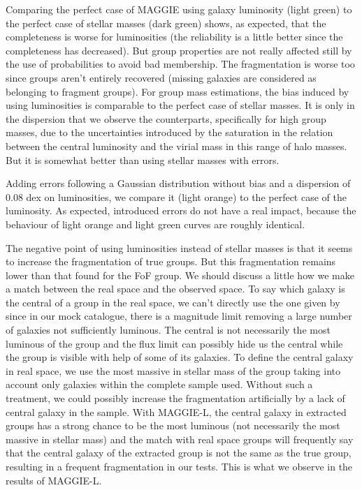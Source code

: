 Comparing the perfect case of MAGGIE using galaxy luminosity (light green) to
the perfect case of stellar masses (dark green) shows, as expected, that the
completeness is worse for luminosities (the reliability is a little better
since the completeness has decreased). But group properties are not really
affected still by the use of probabilities to avoid bad membership. The
fragmentation is worse too since groups aren't entirely recovered (missing
galaxies are considered as belonging to fragment groups). For group mass
estimations, the bias induced by using luminosities is comparable to the
perfect case of stellar masses. It is only in the dispersion that we observe
the counterparts, specifically for high group masses, due to the uncertainties
introduced by the saturation in the relation between the central luminosity and
the virial mass in this range of halo masses. But it is somewhat better
than using stellar masses with errors.

Adding errors following a Gaussian distribution without bias and a dispersion
of 0.08 dex on luminosities, we compare it (light orange) to the perfect case
of the luminosity. As expected, introduced errors do not have a real impact,
because the behaviour of light orange and light green curves are roughly
identical.

The negative point of using luminosities instead of stellar masses is that it
seems to increase the fragmentation of true groups. But this fragmentation
remains lower than that found for the FoF group. We should discuss a little how
we make a match between the real space and the observed space. To say which
galaxy is the central of a group in the real space, we can't directly use the
one given by~\cite{Guo+11} since in our mock catalogue, there is a magnitude
limit removing a large number of galaxies not sufficiently luminous. The
central is not necessarily the most luminous of the group and the flux limit
can possibly hide us the central while the group is visible with help of some
of its galaxies. To define the central galaxy in real space, we use the most
massive in stellar mass of the group taking into account only galaxies within
the complete sample used. Without such a treatment, we could possibly increase
the fragmentation artificially by a lack of central galaxy in the sample. With
MAGGIE-L, the central galaxy in extracted groups has a strong chance to be the
most luminous (not necessarily the most massive in stellar mass) and the match
with real space groups will frequently say that the central galaxy of the
extracted group is not the same as the true group, resulting in a frequent
fragmentation in our tests. This is what we observe in the results of MAGGIE-L.

